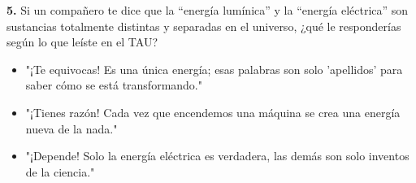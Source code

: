 \documentclass[12pt, letterpaper]{article}
\newif\ifshowanswers
\newcommand{\casillaVerdadera}{\ifshowanswers \textcolor{blue}{$\blacksquare$} \else $\square$ \fi}
\newcommand{\casillaFalsa}{\ifshowanswers $\square$ \else $\square$ \fi}
\begin{document}
	\vspace{0.6cm}
	
	\noindent \textbf{5.} Si un compañero te dice que la ``energía lumínica'' y la ``energía eléctrica'' son sustancias totalmente distintas y separadas en el universo, ¿qué le responderías según lo que leíste en el TAU? 
	
	\vspace{0.4cm} 
	\begin{itemize}[itemsep=0.5cm] 
		\item[ \casillaVerdadera ] "¡Te equivocas! Es una única energía; esas palabras son solo 'apellidos' para saber cómo se está transformando."
		\item[ \casillaFalsa ] "¡Tienes razón! Cada vez que encendemos una máquina se crea una energía nueva de la nada." 
		\item[ \casillaFalsa ] "¡Depende! Solo la energía eléctrica es verdadera, las demás son solo inventos de la ciencia." 
	\end{itemize}
	
	\vspace{1.5cm}
	

	
\end{document}
